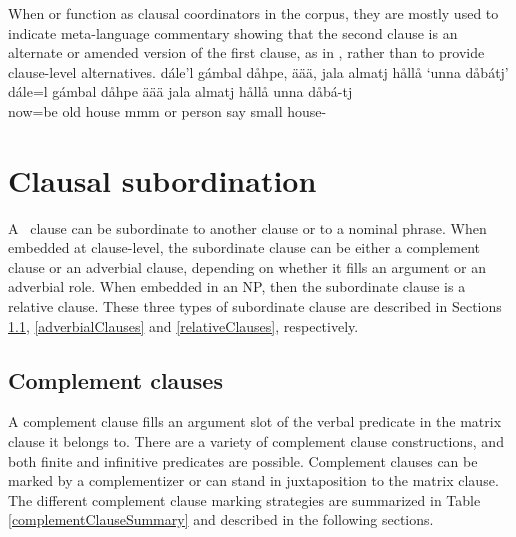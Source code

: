 When  or  function as clausal coordinators in the corpus, 
they are mostly used to indicate meta-language commentary showing that the second clause is an alternate or amended version of the first clause, as in , rather than to provide clause-level alternatives.
\ea\label{ORcoordination1}%
\glll	dále’l gámbal dåhpe, äää, jala almatj hållå ‘unna dåbátj’\\
	dále=l gámbal dåhpe äää jala almatj hållå unna dåbá-tj\\
	now=be\BS{} old house\BS{} mmm or person\BS{} say\BS{} small house-\BS{}\\\nopagebreak
{} %
\z

\section{Clausal subordination}\label{clausalSubordination}
A \PS\ clause can be subordinate to another clause or to a nominal phrase. %
When embedded at clause-level, the subordinate clause can be either a complement clause or an adverbial clause, depending on whether it fills an argument or an adverbial role. 
When embedded in an NP, then the subordinate clause is a relative clause. These three types of subordinate clause are described in Sections \ref{complementClauses}, \ref{adverbialClauses} and \ref{relativeClauses}, respectively.

\subsection{Complement clauses}\label{complementClauses}
A complement clause fills an argument slot of the verbal predicate in the matrix clause it belongs to. 
There are a variety of complement clause constructions, and both finite and infinitive predicates are possible. Complement clauses can be marked by a complementizer %
or can stand in juxtaposition to the matrix clause. %
The different complement clause marking strategies are summarized in Table \vref{complementClauseSummary} and described in the following sections.

